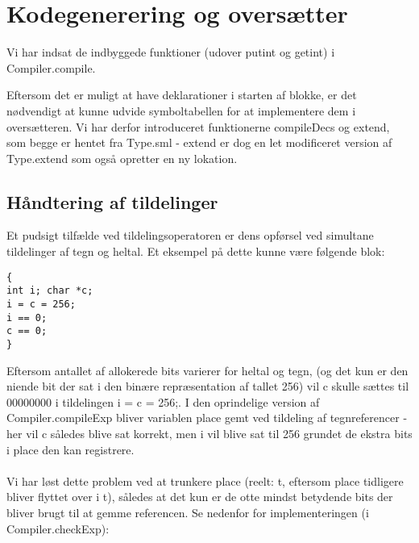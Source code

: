 \documentclass[10pt,a4paper,danish]{article}
\begin{document}
\begin{verbatim}

\end{verbatim} 

\section{Kodegenerering og oversætter}
Vi har indsat de indbyggede funktioner (udover putint og getint) i 
Compiler.compile. 

Eftersom det er muligt at have deklarationer i starten af blokke, er det 
nødvendigt at kunne udvide symboltabellen for at implementere dem i 
oversætteren. Vi har derfor introduceret funktionerne compileDecs og 
extend, som begge er hentet fra Type.sml - extend er dog 
en let modificeret version af Type.extend  som også
opretter en ny lokation.  

\subsection{Håndtering af tildelinger}
Et pudsigt tilfælde ved tildelingsoperatoren er dens opførsel ved 
simultane tildelinger af tegn og heltal. Et eksempel på dette kunne
være følgende blok: 

\begin{verbatim}
{
int i; char *c;
i = c = 256;
i == 0;
c == 0;
}
\end{verbatim}

Eftersom antallet af allokerede bits varierer for heltal og tegn, 
(og det kun er den niende bit der sat i den binære repræsentation
af tallet 256) vil c skulle sættes til 00000000 i tildelingen
i = c = 256;. I den oprindelige version af Compiler.compileExp
bliver variablen place gemt ved  tildeling af tegnreferencer - 
her vil c således blive sat korrekt, men i vil blive sat til 
256 grundet de ekstra bits i place den kan registrere. 

\paragraph{}
Vi har løst dette problem ved at trunkere place (reelt: t, eftersom
place tidligere bliver flyttet over i t), således at det kun er de
otte mindst betydende bits der bliver brugt til at gemme referencen. 
Se nedenfor for implementeringen (i Compiler.checkExp):

\begin{verbatim}

\end{verbatim}
\end{document}
